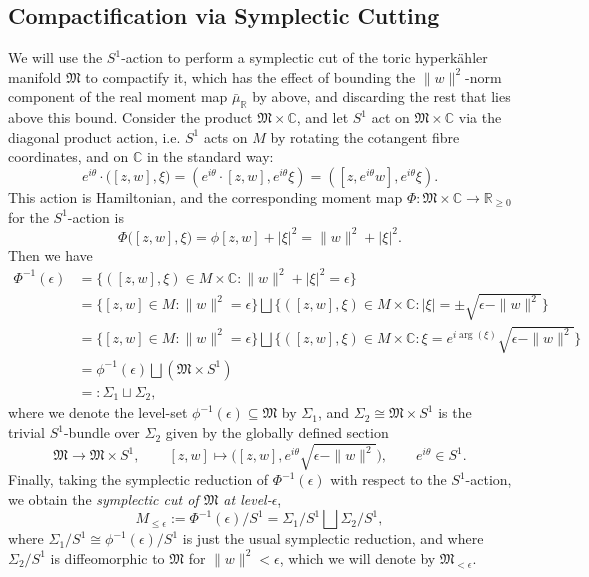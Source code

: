 \documentclass{article}
\newcommand{\st}{\ensuremath{:}}%
\newcommand{\ra}{\rightarrow}
\newcommand{\lbracket}{\left(}
\newcommand{\rbracket}{\right)}
\newcommand{\e}{\epsilon}
\newcommand{\HK}{hyperk\"ahler }
\newcommand{\RR}{\mathbb{R}}
\newcommand{\CC}{\mathbb{C}}
\newcommand{\mf}[1]{\mathfrak{#1}}
\begin{document}
	\subsection{Compactification via Symplectic Cutting}
	
	We will use the $S^{1}$-action to perform a symplectic cut of the toric \HK manifold $\mf{M}$ to compactify it, which has the effect of bounding the $\|w\|^{2}$-norm component of the real moment map $\bar{\mu}_{\RR}$ by above, and discarding the rest that lies above this bound. Consider the product $\mf{M} \times \CC$,  and let $S^{1}$ act on $\mf{M} \times \CC$ via the diagonal product action, i.e. $S^{1}$ acts on $M$ by rotating the cotangent fibre coordinates, and on $\CC$ in the standard way:
	$$
	e^{i\theta} \cdot \big( [z,w], \xi   \big) = \left( e^{i\theta} \cdot [z,w], e^{i\theta}\xi\right) = \left( [z,e^{i\theta}w], e^{i\theta}\xi\right).
	$$
	This action is Hamiltonian, and the corresponding moment map $\Phi : \mf{M} \times \CC \ra \RR_{\geq 0}$ for the $S^{1}$-action is
	\[
	\Phi\big( [z,w], \xi  \big) = \phi[z,w] + |\xi|^{2} = \|w\|^{2} + |\xi|^{2}.
	\]
	Then we have
	\begin{equation*}
		\begin{split}
			\Phi^{-1}(\e) &= \big\{ ([z,w],\xi) \in M \times \CC \st \|w\|^{2} + |\xi|^{2} = \e    \big\} \\
			&= \big\{ [z,w] \in M \st \|w\|^{2} = \e    \big\} \bigsqcup \big\{ ([z,w],\xi) \in M \times \CC \st |\xi| = \pm\sqrt{\e - \|w\|^{2}} \big\} \\
			&= \big\{ [z,w] \in M \st \|w\|^{2} = \e    \big\} \bigsqcup \big\{ ([z,w],\xi) \in M \times \CC \st \xi = e^{i\arg(\xi)}\sqrt{\e - \|w\|^{2}}    \big\} \\
			&= \phi^{-1}(\e) \bigsqcup \lbracket \mf{M} \times S^{1}\rbracket \\
			&=: \Sigma_{1} \sqcup \Sigma_{2},
		\end{split}
	\end{equation*}
	where we denote the level-set $\phi^{-1}(\e) \subseteq \mf{M}$ by $\Sigma_{1}$, and $\Sigma_{2} \cong \mf{M} \times S^{1}$ is the trivial $S^{1}$-bundle over $\Sigma_{2}$ given by the globally defined section
	\begin{equation*}
		\mf{M} \rightarrow \mf{M} \times S^{1}, \qquad [z,w] \longmapsto \big( [z,w], e^{i\theta}\sqrt{\e - \|w\|^{2}}\big), \qquad e^{i\theta} \in S^{1}.
	\end{equation*}
	Finally, taking the symplectic reduction of $\Phi^{-1}(\e)$ with respect to the $S^{1}$-action, we obtain the \emph{symplectic cut of $\mf{M}$ at level-$\e$},
	\begin{equation*}
		M_{\leq \e} := \Phi^{-1}(\e)/S^{1} = \Sigma_{1}/S^{1} \bigsqcup \Sigma_{2}/S^{1},
	\end{equation*}
	where $\Sigma_{1}/S^{1} \cong \phi^{-1}(\e)/S^{1}$ is just the usual symplectic reduction, and where $\Sigma_{2}/S^{1}$ is diffeomorphic to $\mf{M}$ for $\|w\|^{2} < \e$, which we will denote by $\mf{M}_{<\epsilon}$.
	
\end{document}
